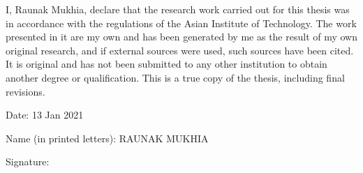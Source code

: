\setlength{\parindent}{0pt}
\setlength{\parskip}{1em}
\setlength{\baselineskip}{1.5em}

\begin{center}
  \fontsize{14}{17}
\end{center}
\vspace{2em}

I, Raunak Mukhia, declare that the research work carried out for this thesis was in accordance with the regulations of the Asian Institute of Technology. The work presented in it are my own and has been generated by me as the result of my own original research, and if external sources were used, such sources have been cited. It is original and has not been submitted to any other institution to obtain another degree or qualification. This is a true copy of the thesis, including final revisions.

Date: 13 Jan 2021

Name (in printed letters): RAUNAK MUKHIA 

Signature: 
%
